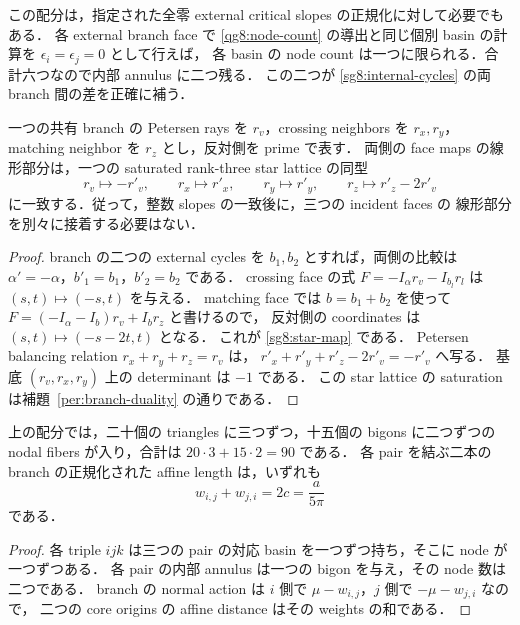 この配分は，指定された全零 external critical slopes の正規化に対して必要でもある．
各 external branch face で \eqref{qg8:node-count} の導出と同じ個別 basin の計算を
$\epsilon_i=\epsilon_j=0$ として行えば，
各 basin の node count は一つに限られる．合計六つなので内部 annulus に二つ残る．
この二つが \eqref{sg8:internal-cycles} の両 branch 間の差を正確に補う．

\begin{lemma}
\label{sg8:star}
一つの共有 branch の Petersen rays を $r_v$，crossing neighbors を $r_x,r_y$，
matching neighbor を $r_z$ とし，反対側を prime で表す．
両側の face maps の線形部分は，一つの saturated rank-three star lattice の同型
\begin{equation}\label{sg8:star-map}
 r_v\longmapsto-r'_v,\qquad
 r_x\longmapsto r'_x,\qquad r_y\longmapsto r'_y,\qquad
 r_z\longmapsto r'_z-2r'_v
\end{equation}
に一致する．従って，整数 slopes の一致後に，三つの incident faces の
線形部分を別々に接着する必要はない．
\end{lemma}

\begin{proof}
branch の二つの external cycles を $b_1,b_2$ とすれば，両側の比較は
$\alpha'=-\alpha$，$b'_1=b_1$，$b'_2=b_2$ である．
crossing face の式 $F=-I_\alpha r_v-I_{b_l}r_l$ は
$(s,t)\mapsto(-s,t)$ を与える．
matching face では $b=b_1+b_2$ を使って
$F=(-I_\alpha-I_b)r_v+I_b r_z$ と書けるので，
反対側の coordinates は $(s,t)\mapsto(-s-2t,t)$ となる．
これが \eqref{sg8:star-map} である．
Petersen balancing relation $r_x+r_y+r_z=r_v$ は，
$r'_x+r'_y+r'_z-2r'_v=-r'_v$ へ写る．
基底 $(r_v,r_x,r_y)$ 上の determinant は $-1$ である．
この star lattice の saturation は補題~\ref{per:branch-duality} の通りである．
\end{proof}

\begin{corollary}
\label{sg8:counts}
上の配分では，二十個の triangles に三つずつ，十五個の bigons に二つずつの
nodal fibers が入り，合計は $20\cdot3+15\cdot2=90$ である．
各 pair を結ぶ二本の branch の正規化された affine length は，いずれも
\[
 w_{i,j}+w_{j,i}=2c=\frac{a}{5\pi}
\]
である．
\end{corollary}

\begin{proof}
各 triple $ijk$ は三つの pair の対応 basin を一つずつ持ち，そこに node が一つずつある．
各 pair の内部 annulus は一つの bigon を与え，その node 数は二つである．
branch の normal action は $i$ 側で $\mu-w_{i,j}$，$j$ 側で $-\mu-w_{j,i}$ なので，
二つの core origins の affine distance はその weights の和である．
\end{proof}

